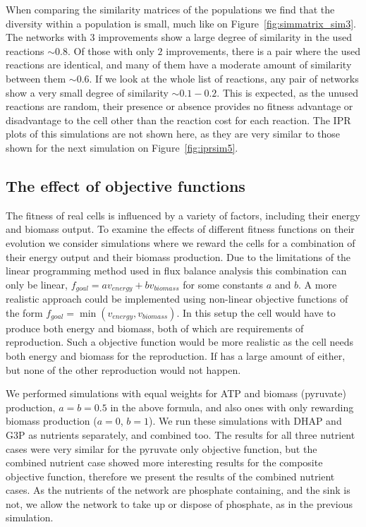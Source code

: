 \documentclass[a4paper,12pt]{article}
\begin{document}
When comparing the similarity matrices of the populations we find that the diversity within a population is small, much like on Figure~\ref{fig:simmatrix_sim3}. The networks with $3$ improvements show a large degree of similarity in the used reactions $\sim 0.8$. Of those with only $2$ improvements, there is a pair where the used reactions are identical, and many of them have a moderate amount of similarity between them $\sim 0.6$. If we look at the whole list of reactions, any pair of networks show a very small degree of similarity $\sim 0.1-0.2$. This is expected, as the unused reactions are random, their presence or absence provides no fitness advantage or disadvantage to the cell other than the reaction cost for each reaction. The IPR plots of this simulations are not shown here, as they are very similar to those shown for the next simulation on Figure~\ref{fig:iprsim5}. 

\subsection{The effect of objective functions}
\label{sub:goalfuncs}

The fitness of real cells is influenced by a variety of factors, including their energy and biomass output. To examine the effects of different fitness functions on their evolution we consider simulations where we reward the cells for a combination of their energy output and their biomass production. Due to the limitations of the linear programming method used in flux balance analysis this combination can only be linear, $f_{goal}=a v_{energy}+ b v_{biomass}$ for some constants $a$ and $b$. A more realistic approach could be implemented using non-linear objective functions of the form $f_{goal}=\min \left( v_{energy},v_{biomass} \right)$. In this setup the cell would have to produce both energy and biomass, both of which are requirements of reproduction. Such a objective function would be more realistic as the cell needs both energy and biomass for the reproduction. If has a large amount of either, but none of the other reproduction would not happen. 

We performed simulations with equal weights for ATP and biomass (pyruvate) production, $a=b=0.5$ in the above formula, and also ones with only rewarding biomass production ($a=0$, $b=1$). We run these simulations with DHAP and G3P as nutrients separately, and combined too. The results for all three nutrient cases were very similar for the pyruvate only objective function, but the combined nutrient case showed more interesting results for the composite objective function, therefore we present the results of the combined nutrient cases. As the nutrients of the network are phosphate containing, and the sink is not, we allow the network to take up or dispose of phosphate, as in the previous simulation. 
\end{document}
